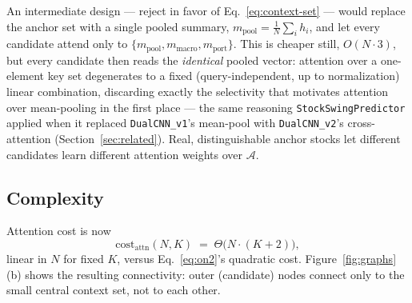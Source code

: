 \documentclass[11pt]{article}
\newcommand{\code}[1]{\texttt{#1}}
\begin{document}
An intermediate design --- reject in favor of Eq.~\eqref{eq:context-set} ---
would replace the anchor set with a single pooled summary,
$m_{\text{pool}} = \frac{1}{N}\sum_i h_i$, and let every candidate attend
only to $\{m_{\text{pool}}, m_{\text{macro}}, m_{\text{port}}\}$. This is
cheaper still, $O(N\cdot 3)$, but every candidate then reads the
\emph{identical} pooled vector: attention over a one-element key set
degenerates to a fixed (query-independent, up to normalization) linear
combination, discarding exactly the selectivity that motivates attention
over mean-pooling in the first place --- the same reasoning
\texttt{StockSwingPredictor} applied when it replaced \code{DualCNN\_v1}'s
mean-pool with \code{DualCNN\_v2}'s cross-attention
(Section~\ref{sec:related}). Real, distinguishable anchor stocks let
different candidates learn different attention weights over $\mathcal{A}$.

\subsection{Complexity}

Attention cost is now
\begin{equation}
  \mathrm{cost}_{\text{attn}}(N,K) \;=\; \Theta\big(N\cdot(K+2)\big),
  \label{eq:onk}
\end{equation}
linear in $N$ for fixed $K$, versus Eq.~\eqref{eq:on2}'s quadratic cost.
Figure~\ref{fig:graphs}(b) shows the resulting connectivity: outer
(candidate) nodes connect only to the small central context set, not to
each other.
\end{document}
